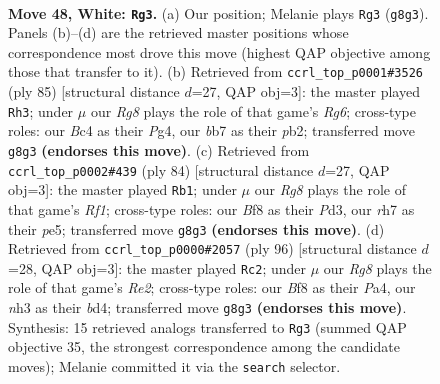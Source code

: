 \documentclass[11pt]{article}
\begin{document}
\clearpage

\begin{figure}[p]\centering
\begin{subfigure}{0.46\textwidth}\centering
\resizebox{\linewidth}{!}{%
\newchessgame
\chessboard[
  setfen={5BR1/pb1p3r/8/5k2/2B5/7n/PPK5/8 w - - 16 48},
  showmover=false,
  pgfstyle=straightmove, color=movearrow, markmove={g8-g3}
]}
\caption{}
\end{subfigure}\hfill
\begin{subfigure}{0.46\textwidth}\centering
\resizebox{\linewidth}{!}{%
\newchessgame
\chessboard[
  setfen={8/R7/3k4/1P6/N5p1/5br1/PP6/5K2 b - - 0 43},
  showmover=false,
  pgfstyle=straightmove, color=movearrow, markmove={g3-h3}
]}
\caption{}
\end{subfigure}
\\[4pt]
\begin{subfigure}{0.46\textwidth}\centering
\resizebox{\linewidth}{!}{%
\newchessgame
\chessboard[
  setfen={8/6k1/3r4/4p1b1/1p1pB3/3P4/7P/5R1K w - - 0 43},
  showmover=false,
  pgfstyle=straightmove, color=movearrow, markmove={f1-b1}
]}
\caption{}
\end{subfigure}\hfill
\begin{subfigure}{0.46\textwidth}\centering
\resizebox{\linewidth}{!}{%
\newchessgame
\chessboard[
  setfen={3r4/8/1p5p/pB1k4/P2b4/6P1/4R1K1/8 w - - 11 49},
  showmover=false,
  pgfstyle=straightmove, color=movearrow, markmove={e2-c2}
]}
\caption{}
\end{subfigure}
\caption{\textbf{Move 48, White: \texttt{Rg3}.} (a) Our position; Melanie plays \texttt{Rg3} (\texttt{g8g3}). Panels (b)--(d) are the retrieved master positions whose correspondence most drove this move (highest QAP objective among those that transfer to it). (b) Retrieved from \texttt{ccrl\_top\_p0001\#3526} (ply 85) [structural distance $d$=27, QAP obj=3]: the master played \texttt{Rh3}; under $\mu$ our \emph{Rg8} plays the role of that game's \emph{Rg6}; cross-type roles: our \emph{B}c4 as their \emph{P}g4, our \emph{b}b7 as their \emph{p}b2; transferred move \texttt{g8g3} \textbf{(endorses this move)}. (c) Retrieved from \texttt{ccrl\_top\_p0002\#439} (ply 84) [structural distance $d$=27, QAP obj=3]: the master played \texttt{Rb1}; under $\mu$ our \emph{Rg8} plays the role of that game's \emph{Rf1}; cross-type roles: our \emph{B}f8 as their \emph{P}d3, our \emph{r}h7 as their \emph{p}e5; transferred move \texttt{g8g3} \textbf{(endorses this move)}. (d) Retrieved from \texttt{ccrl\_top\_p0000\#2057} (ply 96) [structural distance $d$=28, QAP obj=3]: the master played \texttt{Rc2}; under $\mu$ our \emph{Rg8} plays the role of that game's \emph{Re2}; cross-type roles: our \emph{B}f8 as their \emph{P}a4, our \emph{n}h3 as their \emph{b}d4; transferred move \texttt{g8g3} \textbf{(endorses this move)}. Synthesis: 15 retrieved analogs transferred to \texttt{Rg3} (summed QAP objective 35, the strongest correspondence among the candidate moves); Melanie committed it via the \texttt{search} selector.}
\label{fig:thought-m94}
\end{figure}
\end{document}
